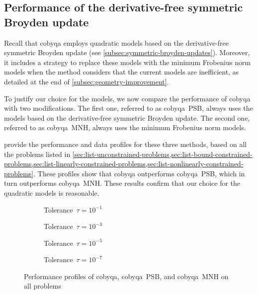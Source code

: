 \subsection{Performance of the derivative-free symmetric Broyden update}
\label{subsec:alternative-models}

Recall that \gls{cobyqa} employs quadratic models based on the derivative-free symmetric Broyden update (see \cref{subsec:symmetric-broyden-updates}).
Moreover, it includes a strategy to replace these models with the minimum Frobenius norm models when the method considers that the current models are inefficient, as detailed at the end of \cref{subsec:geometry-improvement}.

To justify our choice for the models, we now compare the performance of \gls{cobyqa} with two modifications.
The first one, referred to as \gls{cobyqa}~PSB, always uses the models based on the derivative-free symmetric Broyden update.
The second one, referred to as \gls{cobyqa}~MNH, always uses the minimum Frobenius norm models.

 provide the performance and data profiles for these three methods, based on all the problems listed in \cref{sec:list-unconstrained-problems,sec:list-bound-constrained-problems,sec:list-linearly-constrained-problems,sec:list-nonlinearly-constrained-problems}.
These profiles show that \gls{cobyqa} outperforms \gls{cobyqa}~PSB, which in turn outperforms \gls{cobyqa}~MNH.
These results confirm that our choice for the quadratic models is reasonable.

\begin{figure}[ht]
    \centering
    \begin{subfigure}[b]{0.49\textwidth}
        \centering
        \caption{Tolerance~$\tau = 10^{-1}$}
    \end{subfigure}
    \hfill
    \begin{subfigure}[b]{0.49\textwidth}
        \centering
        \caption{Tolerance~$\tau = 10^{-3}$}
    \end{subfigure}
    \begin{subfigure}[b]{0.49\textwidth}
        \centering
        \caption{Tolerance~$\tau = 10^{-5}$}
    \end{subfigure}
    \hfill
    \begin{subfigure}[b]{0.49\textwidth}
        \centering
        \caption{Tolerance~$\tau = 10^{-7}$}
    \end{subfigure}
    \caption[Performance profiles with different models]{Performance profiles of \gls{cobyqa}, \gls{cobyqa}~PSB, and \gls{cobyqa}~MNH on all problems}
    \label{fig:perf-models}
\end{figure}

